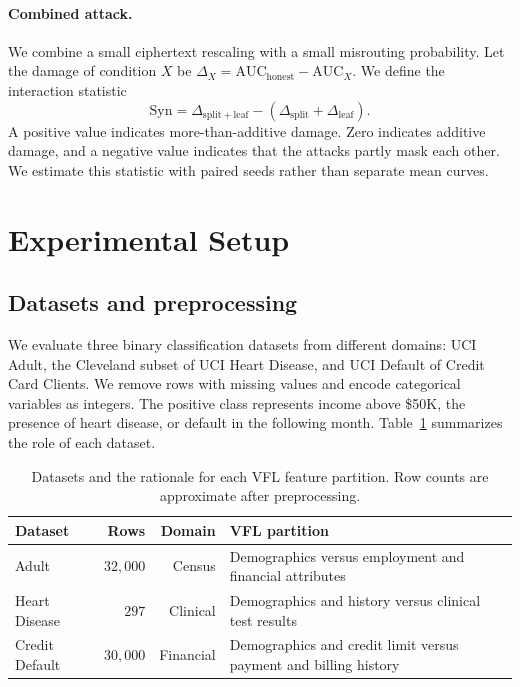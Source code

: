 \documentclass[11pt]{article}
\begin{document}
\paragraph{Combined attack.}
We combine a small ciphertext rescaling with a small misrouting probability. Let the damage of condition $X$ be $\Delta_X=\mathrm{AUC}_{\mathrm{honest}}-\mathrm{AUC}_X$. We define the interaction statistic
\begin{equation}
\mathrm{Syn}
=\Delta_{\mathrm{split}+\mathrm{leaf}}
-\left(\Delta_{\mathrm{split}}+\Delta_{\mathrm{leaf}}\right).
\label{eq:synergy}
\end{equation}
A positive value indicates more-than-additive damage. Zero indicates additive damage, and a negative value indicates that the attacks partly mask each other. We estimate this statistic with paired seeds rather than separate mean curves.

\section{Experimental Setup}
\label{sec:setup}

\subsection{Datasets and preprocessing}

We evaluate three binary classification datasets from different domains: UCI Adult, the Cleveland subset of UCI Heart Disease, and UCI Default of Credit Card Clients. We remove rows with missing values and encode categorical variables as integers. The positive class represents income above \$50K, the presence of heart disease, or default in the following month. Table~\ref{tab:datasets} summarizes the role of each dataset.

\begin{table}[htbp]
\centering
\caption{Datasets and the rationale for each VFL feature partition. Row counts are approximate after preprocessing.}
\begin{tabular}{lrrp{7.0cm}}
\toprule
Dataset & Rows & Domain & VFL partition \\
\midrule
Adult & $32{,}000$ & Census & Demographics versus employment and financial attributes \\
Heart Disease & $297$ & Clinical & Demographics and history versus clinical test results \\
Credit Default & $30{,}000$ & Financial & Demographics and credit limit versus payment and billing history \\
\bottomrule
\end{tabular}
\label{tab:datasets}
\end{table}
\end{document}
